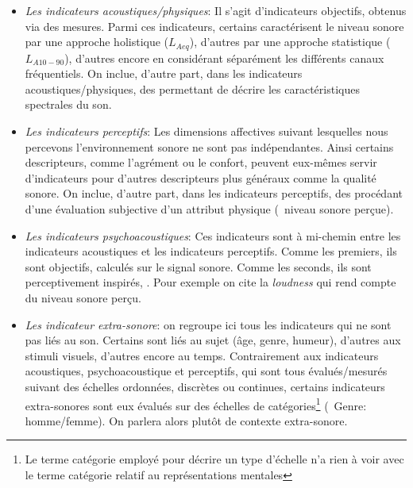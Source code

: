 \begin{itemize}
\begin{itemize}
\item \emph{Les indicateurs acoustiques/physiques}: Il s'agit d'indicateurs objectifs, obtenus via des mesures. Parmi ces indicateurs, certains caractérisent le niveau sonore par une approche holistique ($L_{Aeq}$), d'autres par une approche statistique ($L_{A10-90}$), d'autres encore en considérant séparément les différents canaux fréquentiels. On inclue, d'autre part, dans les indicateurs acoustiques/physiques, des  permettant de décrire les caractéristiques spectrales du son.

\item \emph{Les indicateurs perceptifs}: Les dimensions affectives suivant lesquelles nous percevons l'environnement sonore ne sont pas indépendantes. Ainsi certains descripteurs, comme l'agrément ou le confort, peuvent eux-mêmes servir d'indicateurs pour d'autres descripteurs plus généraux comme la qualité sonore. On inclue, d'autre part, dans les indicateurs perceptifs, des  procédant d'une évaluation subjective d'un attribut physique (\eg~niveau sonore perçue).

\item \emph{Les indicateurs psychoacoustiques}: Ces indicateurs sont à mi-chemin entre les indicateurs acoustiques et les indicateurs perceptifs. Comme les premiers, ils sont objectifs, calculés sur le signal sonore. Comme les seconds, ils sont perceptivement inspirés, . Pour exemple on cite la \emph{loudness} qui rend compte du niveau sonore perçu.

\item \emph{Les indicateur extra-sonore}: on regroupe ici tous les indicateurs qui ne sont pas liés au son. Certains sont liés au sujet (âge, genre, humeur), d'autres aux stimuli visuels, d'autres encore au temps. Contrairement aux indicateurs acoustiques, psychoacoustique et perceptifs, qui sont tous évalués/mesurés suivant des échelles ordonnées, discrètes ou continues, certains indicateurs extra-sonores sont eux évalués sur des échelles de catégories\footnote{Le terme catégorie employé pour décrire un type d'échelle n'a rien à voir avec le terme catégorie relatif au représentations mentales} (\eg~Genre: homme/femme). On parlera alors plutôt de contexte extra-sonore.
\end{itemize}

\end{itemize}

